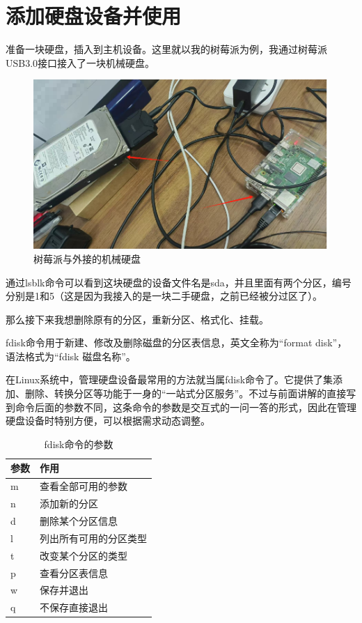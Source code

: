 \documentclass[UTF8]{article}
\begin{document}
	
	\section{添加硬盘设备并使用}
	
	准备一块硬盘，插入到主机设备。这里就以我的树莓派为例，我通过树莓派USB3.0接口接入了一块机械硬盘。

	\begin{figure}[H]
		\centering
		\includegraphics[scale=0.5]{my_drive.png}
		\caption{树莓派与外接的机械硬盘}
	\end{figure}
	
	通过lsblk命令可以看到这块硬盘的设备文件名是sda，并且里面有两个分区，编号分别是1和5（这是因为我接入的是一块二手硬盘，之前已经被分过区了）。
	
	那么接下来我想删除原有的分区，重新分区、格式化、挂载。
	
	fdisk命令用于新建、修改及删除磁盘的分区表信息，英文全称为“format disk”，语法格式为“fdisk 磁盘名称”。
	
	在Linux系统中，管理硬盘设备最常用的方法就当属fdisk命令了。它提供了集添加、删除、转换分区等功能于一身的“一站式分区服务”。不过与前面讲解的直接写到命令后面的参数不同，这条命令的参数是交互式的一问一答的形式，因此在管理硬盘设备时特别方便，可以根据需求动态调整。
	
	\begin{table}[H]
		\centering
		\caption{fdisk命令的参数}
		\begin{tabular}{ll}
			\hline
			参数 & 作用 \\
			\hline
			m & 查看全部可用的参数 \\
			n & 添加新的分区 \\
			d & 删除某个分区信息 \\
			l & 列出所有可用的分区类型 \\
			t & 改变某个分区的类型 \\
			p & 查看分区表信息 \\
			w & 保存并退出 \\
			q & 不保存直接退出 \\
			\hline
		\end{tabular}
	\end{table}
	
\end{document}
